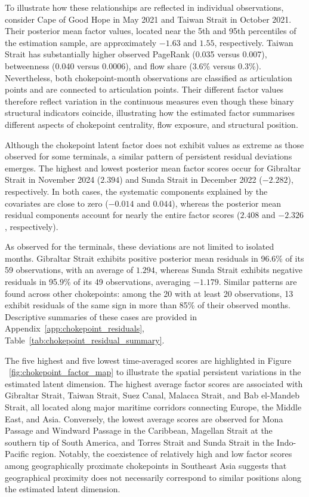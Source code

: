 \documentclass[pdftex,12pt,openright,a4paper,oneside]{book}
\begin{document}
To illustrate how these relationships are reflected in individual observations, consider Cape of Good Hope in May 2021 and Taiwan Strait 
in October 2021. Their posterior mean factor values, located near the 5th and 95th percentiles of the estimation sample, are approximately 
$-1.63$ and $1.55$, respectively. Taiwan Strait has substantially higher observed PageRank (0.035 versus 0.007), betweenness 
(0.040 versus 0.0006), and flow share (3.6\% versus 0.3\%). Nevertheless, both chokepoint-month observations are classified as 
articulation points and are connected to articulation points. Their different factor values therefore reflect variation in the 
continuous measures even though these binary structural indicators coincide, illustrating how the estimated factor summarises different 
aspects of chokepoint centrality, flow exposure, and structural position.

Although the chokepoint latent factor does not exhibit values as extreme as those observed for some terminals, a similar pattern of 
persistent residual deviations emerges. The highest and lowest posterior mean factor scores occur for Gibraltar Strait in November 2024 
($2.394$) and Sunda Strait in December 2022 ($-2.282$), respectively. In both cases, the systematic components explained by the 
covariates are close to zero ($-0.014$ and $0.044$), whereas the posterior mean residual components account for nearly the entire factor 
scores ($2.408$ and $-2.326$, respectively).

As observed for the terminals, these deviations are not limited to isolated months. Gibraltar Strait exhibits positive posterior mean 
residuals in 96.6\% of its 59 observations, with an average of $1.294$, whereas Sunda Strait exhibits negative residuals in 95.9\% of 
its 49 observations, averaging $-1.179$. Similar patterns are found across other chokepoints: among the 20 with at least 20 observations, 
13 exhibit residuals of the same sign in more than 85\% of their observed months. Descriptive summaries of these cases are provided in 
Appendix~\ref{app:chokepoint_residuals}, Table~\ref{tab:chokepoint_residual_summary}.

The five highest and five lowest time-averaged scores are highlighted  in Figure ~\ref{fig:chokepoint_factor_map} to illustrate the spatial persistent variations in the estimated latent dimension.
The highest average factor scores are associated with Gibraltar Strait, Taiwan Strait, Suez Canal, Malacca Strait, and Bab el-Mandeb Strait, 
all located along major maritime corridors connecting Europe, the Middle East, and Asia. 
Conversely, the lowest average scores are observed for Mona Passage and Windward Passage in the Caribbean, Magellan Strait at the 
southern tip of South America, and Torres Strait and Sunda Strait in the Indo-Pacific region.
Notably, the coexistence of relatively high and low factor scores among geographically proximate chokepoints in Southeast Asia suggests 
that geographical proximity does not necessarily correspond to similar positions along the estimated latent dimension.
\end{document}
